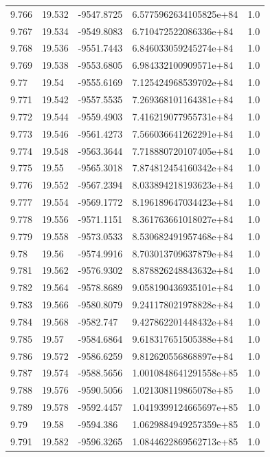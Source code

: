 \begin{tabular}{lllll}
9.766 & 19.532 & -9547.8725 & 6.5775962634105825e+84 & 1.0 \\
9.767 & 19.534 & -9549.8083 & 6.710472522086336e+84 & 1.0 \\
9.768 & 19.536 & -9551.7443 & 6.846033059245274e+84 & 1.0 \\
9.769 & 19.538 & -9553.6805 & 6.984332100909571e+84 & 1.0 \\
9.77 & 19.54 & -9555.6169 & 7.125424968539702e+84 & 1.0 \\
9.771 & 19.542 & -9557.5535 & 7.269368101164381e+84 & 1.0 \\
9.772 & 19.544 & -9559.4903 & 7.416219077955731e+84 & 1.0 \\
9.773 & 19.546 & -9561.4273 & 7.566036641262291e+84 & 1.0 \\
9.774 & 19.548 & -9563.3644 & 7.718880720107405e+84 & 1.0 \\
9.775 & 19.55 & -9565.3018 & 7.874812454160342e+84 & 1.0 \\
9.776 & 19.552 & -9567.2394 & 8.033894218193623e+84 & 1.0 \\
9.777 & 19.554 & -9569.1772 & 8.196189647034423e+84 & 1.0 \\
9.778 & 19.556 & -9571.1151 & 8.361763661018027e+84 & 1.0 \\
9.779 & 19.558 & -9573.0533 & 8.530682491957468e+84 & 1.0 \\
9.78 & 19.56 & -9574.9916 & 8.703013709637879e+84 & 1.0 \\
9.781 & 19.562 & -9576.9302 & 8.878826248843632e+84 & 1.0 \\
9.782 & 19.564 & -9578.8689 & 9.058190436935101e+84 & 1.0 \\
9.783 & 19.566 & -9580.8079 & 9.241178021978828e+84 & 1.0 \\
9.784 & 19.568 & -9582.747 & 9.427862201448432e+84 & 1.0 \\
9.785 & 19.57 & -9584.6864 & 9.618317651505388e+84 & 1.0 \\
9.786 & 19.572 & -9586.6259 & 9.812620556868897e+84 & 1.0 \\
9.787 & 19.574 & -9588.5656 & 1.0010848641291558e+85 & 1.0 \\
9.788 & 19.576 & -9590.5056 & 1.021308119865078e+85 & 1.0 \\
9.789 & 19.578 & -9592.4457 & 1.0419399124665697e+85 & 1.0 \\
9.79 & 19.58 & -9594.386 & 1.0629884949257359e+85 & 1.0 \\
9.791 & 19.582 & -9596.3265 & 1.0844622869562713e+85 & 1.0 \\

\end{tabular}
